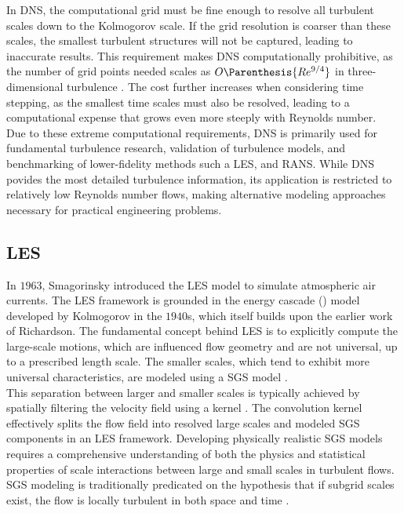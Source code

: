 In \gls{DNS}, the computational grid must be fine
enough to resolve all turbulent scales down to the Kolmogorov scale. If the
grid resolution is coarser than these scales, the smallest turbulent structures
will not be captured, leading to inaccurate results. This requirement makes
\gls{DNS} computationally prohibitive, as the number of grid points needed
scales as $O\Parenthesis{Re^{9/4}}$ in three-dimensional turbulence
\cite{Pope2000}. The cost further increases when considering time stepping, as
the smallest time scales must also be resolved, leading to a computational
expense that grows even more steeply with Reynolds number. \\

Due to these extreme computational requirements, \gls{DNS} is primarily used
for fundamental turbulence research, validation of turbulence models, and
benchmarking of lower-fidelity methods such a \gls{LES}, and \gls{RANS}. While
\gls{DNS} povides the most detailed turbulence information, its application is
restricted to relatively low Reynolds number flows, making alternative modeling
approaches necessary for practical engineering problems.

\subsection{\acrfull{LES}}
In $1963$, Smagorinsky \cite{Smagorinsky1963} introduced the \gls{LES} model to
simulate atmospheric air currents. The \gls{LES} framework is grounded in the
energy cascade () model developed by Kolmogorov in the 
$1940$s, which itself builds upon the earlier work of Richardson. The
fundamental concept behind \gls{LES} is to explicitly compute the large-scale
motions, which are influenced flow geometry and are not universal, up to a
prescribed length scale. The smaller scales, which tend to exhibit more
universal characteristics, are modeled using a \gls{SGS} model
\cite{Pope2000}.\\

This separation between larger and smaller scales is typically achieved by
spatially filtering the velocity field using a kernel \cite{Leonard1975}. The
convolution kernel effectively splits the flow field into resolved large scales
and modeled \gls{SGS} components in an \gls{LES} framework. Developing
physically realistic \gls{SGS} models requires a comprehensive understanding of
both the physics and statistical properties of scale interactions between large
and small scales in turbulent flows. \gls{SGS} modeling is traditionally
predicated on the hypothesis that if subgrid scales exist, the flow is locally
turbulent in both space and time \cite{Garnier2009}.\\


